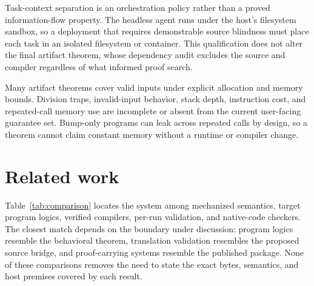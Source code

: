 \documentclass[11pt]{article}
\begin{document}
Task-context separation is an orchestration policy rather than a proved information-flow property.  The headless agent runs under the host's filesystem sandbox, so a deployment that requires demonstrable source blindness must place each task in an isolated filesystem or container.  This qualification does not alter the final artifact theorem, whose dependency audit excludes the source and compiler regardless of what informed proof search.

Many artifact theorems cover valid inputs under explicit allocation and memory bounds.  Division traps, invalid-input behavior, stack depth, instruction cost, and repeated-call memory use are incomplete or absent from the current user-facing guarantee set.  Bump-only programs can leak across repeated calls by design, so a theorem cannot claim constant memory without a runtime or compiler change.

\section{Related work}

Table~\ref{tab:comparison} locates the system among mechanized semantics, target program logics, verified compilers, per-run validation, and native-code checkers.  The closest match depends on the boundary under discussion: program logics resemble the behavioral theorem, translation validation resembles the proposed source bridge, and proof-carrying systems resemble the published package.  None of these comparisons removes the need to state the exact bytes, semantics, and host premises covered by each result.
\end{document}
